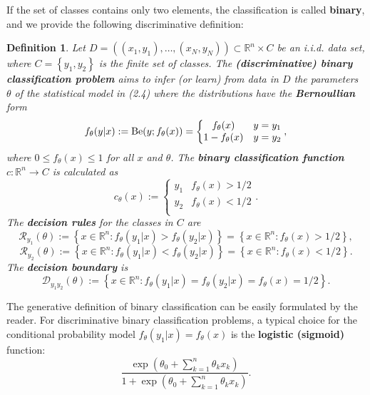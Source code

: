 \documentclass{report}
\newtheorem{definition}{Definition}[chapter]
\begin{document}
If the set of classes contains only two elements, the classification is called \textbf{binary}, and we provide the following discriminative definition:

\begin{definition}
Let $D = ((x_1,y_1),\dots,(x_N,y_N)) \subset \mathbb{R}^n\times C$ be an i.i.d. data set, where $C = \left\{y_1, y_2 \right\}$ is the finite set of classes. The \textbf{(discriminative) binary classification problem} aims to infer (or learn) from data in $D$ the parameters $\theta$ of the statistical model in (2.4) where the distributions have the \textbf{Bernoullian} form
\begin{equation}
f_\theta(y|x) := \textup{Be}(y;f_\theta(x)) = \left\{\begin{matrix}
f_\theta(x) & y=y_1\\
1 - f_\theta(x) & y = y_2 \\
\end{matrix}\right.,
\end{equation}
where $0 \leq f_\theta(x) \leq 1$ for all $x$ and $\theta$. The \textbf{binary classification function} $c : \mathbb{R}^n \to C$ is calculated as
\begin{equation}
c_\theta(x) := \left\{\begin{matrix}
y_1 & f_\theta(x) > 1/2\\
y_2 & f_\theta(x) < 1/2\\
\end{matrix}\right..
\end{equation}
The \textbf{decision rules} for the classes in $C$ are
\begin{equation}
\mathcal{R}_{y_1}(\theta) :=\left\{ x \in \mathbb{R}^n : f_\theta(y_1|x) > f_\theta(y_2|x) \right\} = \left\{ x \in \mathbb{R}^n : f_\theta(x) > 1/2 \right\},
\end{equation}
\begin{equation}
\mathcal{R}_{y_2}(\theta) := \left\{x \in \mathbb{R}^n : f_\theta(y_1|x) < f_\theta(y_2|x) \right\} = \left\{x \in \mathbb{R}^n : f_\theta(x) < 1/2 \right\}.
\end{equation}
The \textbf{decision boundary} is
\begin{equation}
\mathcal{D}_{y_1y_2}(\theta) :=\left\{x \in \mathbb{R}^n : f_\theta(y_1|x) = f_\theta(y_2|x) = f_\theta(x) = 1/2 \right\}.
\end{equation}
\end{definition}

The generative definition of binary classification can be easily formulated by the reader. For discriminative binary classification problems, a typical choice for the conditional probability model $f_\theta(y_1|x) = f_\theta(x)$ is the \textbf{logistic (sigmoid)} function:
\begin{equation}
\frac{\exp\left ( \theta_0 + \sum_{k=1}^{n}\theta_kx_k \right )}{1+\exp\left ( \theta_0 + \sum_{k=1}^{n}\theta_kx_k \right )}.
\end{equation}
\end{document}
